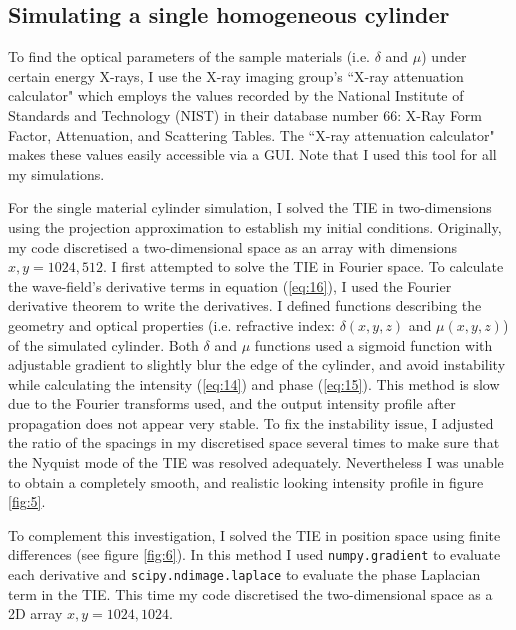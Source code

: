 \documentclass[10pt, a4paper, singlespacing]{report}
\begin{document}
\subsection{Simulating a single homogeneous cylinder}\label{Single cylinder}

To find the optical parameters of the sample materials (i.e. $\delta$ and $\mu$) under certain energy X-rays, I use the X-ray imaging group's ``X-ray attenuation calculator" which employs the values recorded by the National Institute of Standards and Technology (NIST) in their database number 66: X-Ray Form Factor, Attenuation, and Scattering Tables\cite{NIST}. The ``X-ray attenuation calculator" makes these values easily accessible via a GUI. Note that I used this tool for all my simulations.

For the single material cylinder simulation, I solved the TIE in two-dimensions using the projection approximation to establish my initial conditions.  Originally, my code discretised a two-dimensional space as an array with dimensions $x, y = 1024, 512$. I first attempted to solve the TIE in Fourier space. To calculate the wave-field's derivative terms in equation (\ref{eq:16}), I used the Fourier derivative theorem to write the derivatives. I defined functions describing the geometry and optical properties (i.e. refractive index: $\delta(x, y, z)$ and $\mu(x, y, z)$) of the simulated cylinder. Both $\delta$ and $\mu$ functions used a sigmoid function with adjustable gradient to slightly blur the edge of the cylinder, and avoid instability while calculating the intensity (\ref{eq:14}) and phase (\ref{eq:15}). This method is slow due to the Fourier transforms used, and the output intensity profile after propagation does not appear very stable. To fix the instability issue, I adjusted the ratio of the spacings in my discretised space several times to make sure that the Nyquist mode of the TIE was resolved adequately. Nevertheless I was unable to obtain a completely smooth, and realistic looking intensity profile in figure \ref{fig:5}.

To complement this investigation, I solved the TIE in position space using finite differences (see figure \ref{fig:6}). In this method I used \texttt{numpy.gradient} to evaluate each derivative and \texttt{scipy.ndimage.laplace} to evaluate the phase Laplacian term in the TIE. This time my code discretised the two-dimensional space as a 2D array $x, y = 1024, 1024$. 
\end{document}
